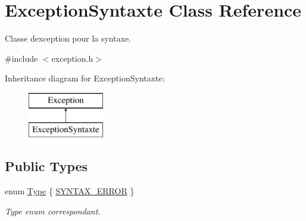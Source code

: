 \hypertarget{class_exception_syntaxte}{}\section{Exception\+Syntaxte Class Reference}
\label{class_exception_syntaxte}


Classe d\textquotesingle{}exception pour la syntaxe.  




{\ttfamily \#include $<$exception.\+h$>$}

Inheritance diagram for Exception\+Syntaxte\+:\begin{figure}[H]
\begin{center}
\leavevmode
\includegraphics[height=2.000000cm]{class_exception_syntaxte}
\end{center}
\end{figure}
\subsection*{Public Types}
\begin{DoxyCompactItemize}
\item 
enum \hyperlink{class_exception_syntaxte_aca9b3139fcaa2b0101b9207fccf3d816}{Type} \{ \hyperlink{class_exception_syntaxte_aca9b3139fcaa2b0101b9207fccf3d816a6b4ad3c2fa8342e8467044175660e7f3}{S\+Y\+N\+T\+A\+X\+\_\+\+E\+R\+R\+OR}
 \}\begin{DoxyCompactList}\small\item\em Type enum correspondant. \end{DoxyCompactList}
\end{DoxyCompactItemize}
